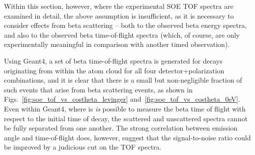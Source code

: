 Within this section, however, where the experimental SOE TOF spectra are examined in detail, the above assumption is insufficient, as it is necessary to consider effects from beta scattering -- both to the observed beta energy spectra, and also to the observed beta time-of-flight spectra (which, of course, are only experimentally meaningful in comparison with another timed observation).  

Using Geant4, a set of beta time-of-flight spectra is generated for decays originating from within the atom cloud for all four detector+polarization combinations, and it is clear that there is a small but non-negligible fraction of such events that arise from beta scattering events, as shown in Figs.~\ref{fig:soe_tof_vs_costheta_levinger} and~\ref{fig:soe_tof_vs_costheta_0eV}.  Even within Geant4, where is \emph{is} possible to measure the beta time of flight with respect to the initial time of decay, the scattered and unscattered spectra cannot be fully separated from one another.  The strong correlation between emission angle and time-of-flight does, however, suggest that the signal-to-noise ratio could be improved by a judicious cut on the TOF spectra. 

